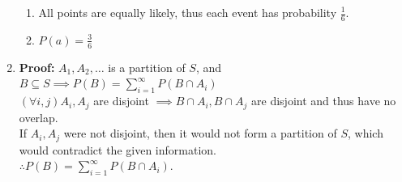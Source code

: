 \documentclass{article}
\newcommand{\proof}[1]{\textbf{Proof: #1}}
\begin{document}
\begin{enumerate}
\begin{enumerate}
      \item All points are equally likely, thus each event has probability $\frac{1}{6}$.
      \item $P(a) = \frac{3}{6}$
    \end{enumerate}
    \item \proof{}$A_1, A_2, \ldots$ is a partition of $S$, and $B \subseteq S \implies P(B) = \sum_{i=1}^{\infty} P(B\cap A_i)$\\
    $(\forall i,j)A_i, A_j$ are disjoint $\implies B\cap A_i, B\cap A_j$ are disjoint and thus have no overlap.\\
    If $A_i, A_j$ were not disjoint, then it would not form a partition of $S$, which would contradict the given information.\\
    $\therefore P(B) = \sum_{i=1}^{\infty}P(B\cap A_i)$.
\end{enumerate}
\end{document}
